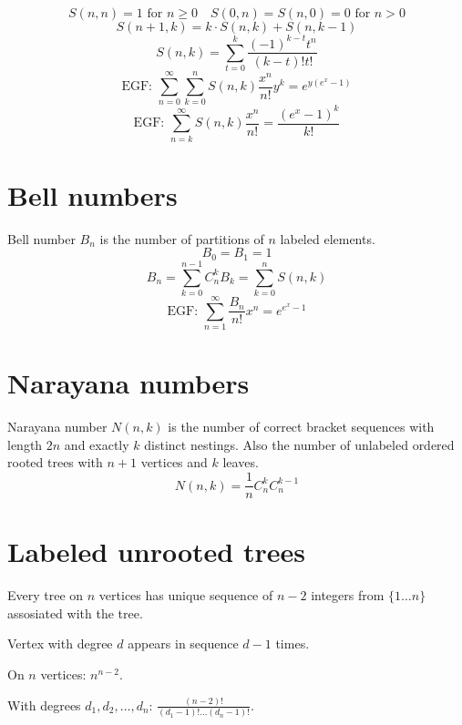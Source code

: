 $$S(n, n) = 1 \text{ for } n \ge 0 \quad S(0, n) = S(n, 0) = 0 \text{ for } n > 0$$
$$S(n + 1, k) = k \cdot S(n, k) + S(n, k - 1)$$
$$S(n, k) = \sum_{t = 0}^{k} \frac{(-1)^{k - t}t^n}{(k - t)!t!}$$
$$\text{EGF: } \sum_{n = 0}^{\infty}\sum_{k=0}^{n} S(n, k)\frac{x^n}{n!}y^k = e^{y(e^x - 1)}$$
$$\text{EGF: } \sum_{n = k}^{\infty} S(n, k)\frac{x^n}{n!} = \frac{(e^x - 1)^k}{k!}$$




\section{Bell numbers}
Bell number $B_n$ is the number of partitions of $n$ labeled elements.
$$B_0 = B_1 = 1$$
$$B_n = \sum_{k = 0}^{n - 1} C_n^k B_k = \sum_{k = 0}^{n} S(n, k)$$
$$\text{EGF: } \sum_{n = 1}^{\infty}\frac{B_n}{n!}x^n = e^{e^x - 1}$$




\section{Narayana numbers}
Narayana number $N(n, k)$ is the number of correct bracket sequences with length $2n$ and exactly $k$ distinct nestings. Also the number of unlabeled ordered rooted trees with $n + 1$ vertices and $k$ leaves.
$$N(n, k) = \frac{1}{n}C_{n}^{k}C_{n}^{k - 1}$$



\section{Labeled unrooted trees}
Every tree on $n$ vertices has unique sequence of $n - 2$ integers from $\{1 \dots n\}$ assosiated with the tree.

Vertex with degree $d$ appears in sequence $d - 1$ times.

On $n$ vertices: $n^{n - 2}$.

With degrees $d_1, d_2, \dots, d_n$: $\frac{(n - 2)!}{(d_1 - 1)! \dots (d_n - 1)!}$.